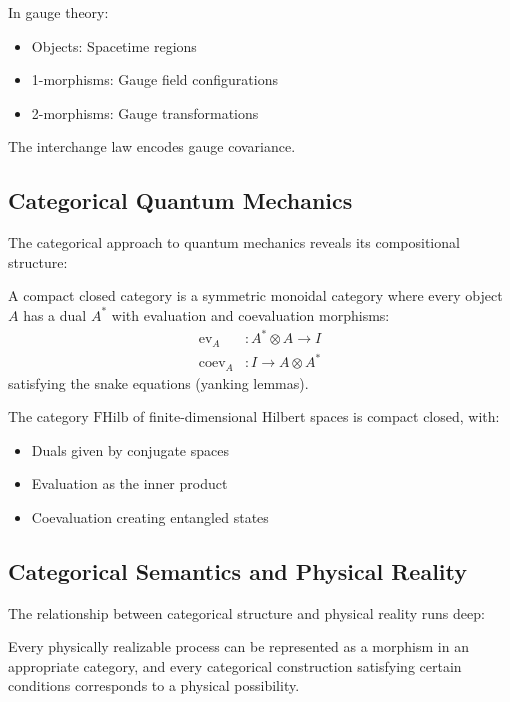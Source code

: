 \begin{example}
In gauge theory:
\begin{itemize}
\item Objects: Spacetime regions
\item 1-morphisms: Gauge field configurations
\item 2-morphisms: Gauge transformations
\end{itemize}
The interchange law encodes gauge covariance.
\end{example}

\subsection{Categorical Quantum Mechanics}

The categorical approach to quantum mechanics reveals its compositional structure:

\begin{definition}
A compact closed category is a symmetric monoidal category where every object $A$ has a dual $A^*$ with evaluation and coevaluation morphisms:
\begin{align}
\text{ev}_A &: A^* \otimes A \to I \\
\text{coev}_A &: I \to A \otimes A^*
\end{align}
satisfying the snake equations (yanking lemmas).
\end{definition}

\begin{theorem}
The category $\text{FHilb}$ of finite-dimensional Hilbert spaces is compact closed, with:
\begin{itemize}
\item Duals given by conjugate spaces
\item Evaluation as the inner product
\item Coevaluation creating entangled states
\end{itemize}
\end{theorem}

\subsection{Categorical Semantics and Physical Reality}

The relationship between categorical structure and physical reality runs deep:

\begin{proposition}
Every physically realizable process can be represented as a morphism in an appropriate category, and every categorical construction satisfying certain conditions corresponds to a physical possibility.
\end{proposition}

